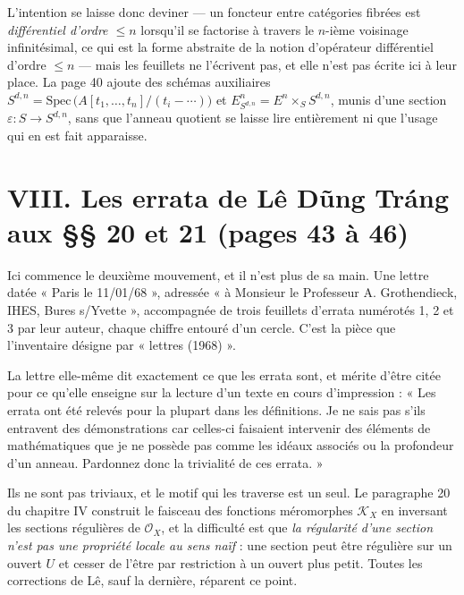 \documentclass[11pt,a4paper]{article}
\begin{document}
L'intention se laisse donc deviner — un foncteur entre catégories fibrées est
\emph{différentiel d'ordre $\leqslant n$} lorsqu'il se factorise à travers le
$n$-ième voisinage infinitésimal, ce qui est la forme abstraite de la notion
d'opérateur différentiel d'ordre $\leqslant n$ — mais les feuillets ne
l'écrivent pas, et elle n'est pas écrite ici à leur place. La page 40 ajoute
des schémas auxiliaires $S^{d,n} = \mathrm{Spec}\,\bigl(A[t_{1},\ldots,t_{n}] /
(t_{i} - \cdots)\bigr)$ et $E^{n}_{S^{d,n}} = E^{n} \times_{S} S^{d,n}$, munis
d'une section $\varepsilon : S \to S^{d,n}$, sans que l'anneau quotient se
laisse lire entièrement ni que l'usage qui en est fait apparaisse.

\section*{VIII. Les errata de Lê Dũng Tráng aux §§ 20 et 21 (pages 43 à 46)}

Ici commence le deuxième mouvement, et il n'est plus de sa main. Une lettre
datée « Paris le 11/01/68 », adressée « à Monsieur le Professeur A.
Grothendieck, IHES, Bures s/Yvette », accompagnée de trois feuillets d'errata
numérotés 1, 2 et 3 par leur auteur, chaque chiffre entouré d'un cercle. C'est la pièce que l'inventaire désigne par
« lettres (1968) ».

La lettre elle-même dit exactement ce que les errata sont, et mérite d'être
citée pour ce qu'elle enseigne sur la lecture d'un texte en cours
d'impression : « Les errata ont été relevés pour la plupart dans les
définitions. Je ne sais pas s'ils entravent des démonstrations car celles-ci
faisaient intervenir des éléments de mathématiques que je ne possède pas comme
les idéaux associés ou la profondeur d'un anneau. Pardonnez donc la trivialité
de ces errata. »

Ils ne sont pas triviaux, et le motif qui les traverse est un seul. Le
paragraphe 20 du chapitre IV construit le faisceau des fonctions méromorphes
$\mathcal{K}_X$ en inversant les sections régulières de $\mathcal{O}_X$, et la
difficulté est que \emph{la régularité d'une section n'est pas une propriété
locale au sens naïf} : une section peut être régulière sur un ouvert $U$ et
cesser de l'être par restriction à un ouvert plus petit. Toutes les corrections
de Lê, sauf la dernière, réparent ce point.
\end{document}
